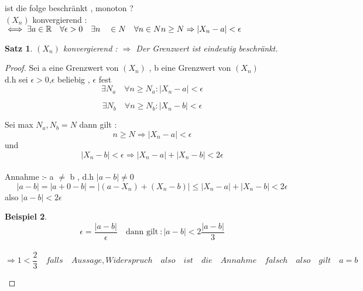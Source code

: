 \documentclass[a4paper,12pt,leqno]{report}
\theoremstyle{plain} %
\newtheorem{theorem}{Satz}[chapter]
\theoremstyle{definition} %
\newtheorem{example}[theorem]{Beispiel}
\begin{document}
\begin{text}
ist die folge beschränkt , monoton ?\\

$(X_n)$ konvergierend : $\iff \exists a \in\mathbb{R} \quad \forall \epsilon > 0 \quad \exists n \quad \in N \quad \forall n \in N \quad \\
 n \geq N \Rightarrow |X_n - a |< \epsilon $  
\end{text}

\begin{theorem}

$(X_n)$ konvergierend : $\Rightarrow$ Der Grenzwert ist eindeutig beschränkt.
 
\end{theorem}

\begin{proof}
Sei a eine Grenzwert von $(X_n)$ , b eine Grenzwert von $(X_n)$ \\
d.h sei $\epsilon > 0$,$\epsilon$ beliebig , $\epsilon$ fest \\

\begin{equation}
\exists  N_a \quad \forall n \geq N_a : |X_n-a|< \epsilon
\end{equation}

\begin{equation}
\exists  N_b \quad \forall n \geq N_b : |X_n-b|< \epsilon
\end{equation}

Sei max ${N_a,N_b}=N$
dann gilt : \\
\begin{equation}
n \geq N \Rightarrow |X_n - a| < \epsilon 
\end{equation}
und \begin{equation}
|X_n -b| < \epsilon \Rightarrow |X_n -a|+|X_n - b|< 2\epsilon
\end{equation}\\

Annahme :- a $\neq$ b , d.h $|a-b|\neq 0 $ 
\[|a-b|=|a+0-b| 
=|(a-X_n)+(X_n-b)| \leq |X_n - a|+|X_n-b|< 2 \epsilon \]
also $|a - b|< 2 \epsilon$


\begin{example}
\[\epsilon = \frac{|a-b|}\epsilon
\quad \text{dann gilt}\ :|a-b|<2 \frac{|a-b|}{3}\]\\

\[ \Rightarrow 1 < \frac{2}{3} \quad falls \quad Aussage, Widerspruch \quad also \quad ist \quad die \quad Annahme \quad falsch \quad also \quad gilt \quad a=b\] 

\end{example}
\end{proof}
\end{document}
